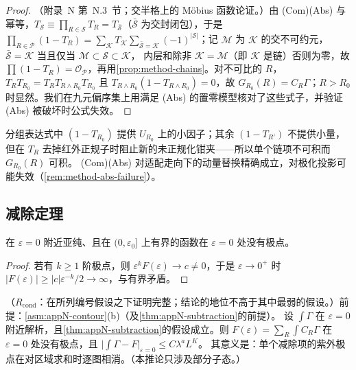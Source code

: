 \begin{proof}
（附录~N 第~N.3~节；交半格上的 Möbius 函数论证。）由 (Com)(Abs) 与幂等，$T_{\mathcal S}\equiv\prod_{R\in\mathcal S}T_R=T_{\bar{\mathcal S}}$（$\bar{\mathcal S}$ 为交封闭包），于是
$\prod_{R\in\mathcal P}(1-T_R)=\sum_{\mathcal K}T_{\mathcal K}\sum_{\bar{\mathcal S}=\mathcal K}(-1)^{|\mathcal S|}$；记 $\mathcal M$ 为 $\mathcal K$ 的交不可约元，$\bar{\mathcal S}=\mathcal K$ 当且仅当 $\mathcal M\subset\mathcal S\subset\mathcal K$，
内层和除非 $\mathcal K=\mathcal M$（即 $\mathcal K$ 是链）否则为零，故 $\prod(1-T_R)=\mathcal O_{\mathcal P}$，再用\cref{prop:method-chains}。对不可比的 $R$，$T_RT_{R_0}=T_RT_{R\wedge R_0}T_{R_0}$ 且
$T_{R\wedge R_0}(1-T_{R\wedge R_0})=0$，故 $G_{R_0}(R)=C_R\Gamma$；$R>R_0$ 时显然。我们在九元偏序集上用满足 (Abs) 的置零模型核对了这些式子，并验证 (Abs) 被破坏时公式失效。%
\end{proof}

分组表达式中 $(1-T_{R_0})$ 提供 $U_{R_0}$ 上的小因子；其余 $(1-T_{R'})$ 不提供小量，但在 $T_R$ 去掉红外正规子时阻止新的未正规化钳夹——所以单个链项不可积而 $G_{R_0}(R)$ 可积。
(Com)(Abs) 对适配走向下的动量替换精确成立，对极化投影可能失效（\cref{rem:method-abs-failure}）。

\subsection{减除定理}

\begin{lemma}[有界的亚纯函数无极点]\label{lem:method-no-pole}
在 $\varepsilon=0$ 附近亚纯、且在 $(0,\varepsilon_0]$ 上有界的函数在 $\varepsilon=0$ 处没有极点。
\end{lemma}

\begin{proof}
若有 $k\ge1$ 阶极点，则 $\varepsilon^kF(\varepsilon)\to c\neq0$，于是 $\varepsilon\to0^+$ 时 $|F(\varepsilon)|\ge|c|\varepsilon^{-k}/2\to\infty$，与有界矛盾。
\end{proof}

\begin{corollary}\label{cor:method-removing-eps}
（$R_{\mathrm{cond}}$：在所列编号假设之下证明完整；结论的地位不高于其中最弱的假设。）前提：\cref{asm:appN-contour}(b)（及\cref{thm:appN-subtraction}的前提）。
设 $\int\Gamma$ 在 $\varepsilon=0$ 附近解析，且\cref{thm:appN-subtraction}的假设成立。则 $F(\varepsilon)=\sum_R\int C_R\Gamma$ 在 $\varepsilon=0$ 处没有极点，且 $\bigl|\int\Gamma-F\bigr|_{\varepsilon=0}\le C\lambda^aL^K$。
其意义是：单个减除项的紫外极点在对区域求和时逐图相消。（本推论只涉及部分子态。）
\end{corollary}

